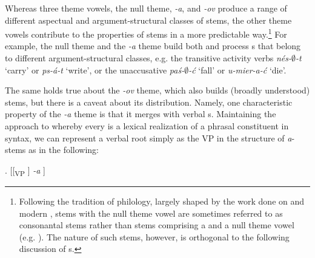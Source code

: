 \par
Whereas three  theme vowels, the null theme, \textit{-a}, and \textit{-ov} produce a range of different aspectual and argument-structural  classes of  stems, the other theme vowels contribute to the properties of  stems  in a more predictable way.\footnote{Following the tradition of  philology, largely shaped by the work done on  and modern ,   stems with the null theme vowel are sometimes referred to as consonantal stems rather than stems comprising a  and a null theme vowel (e.g. \citealt{Rubach1984,czayk1988,Jablonska2007}). The nature of such stems, however, is orthogonal to the following discussion of  s.  
} %
 For example, the null theme and the \textit{-a} theme build both  and process s that belong to different argument-structural classes, e.g. the  transitive activity verbs \textit{n\'es-$\emptyset$-t} `carry' or \textit{ps-\'a-t} `write', or the  unaccusative \textit{pa\'s-$\emptyset$-\'c} `fall' or \textit{u-mier-a-\'c} `die'. 
\par
The same holds true about the \textit{-ov} theme, which also builds (broadly understood)  stems, but there is a caveat about its distribution.  Namely, one characteristic property of the \textit{-a} theme is that it merges with verbal s. Maintaining the approach to  whereby every  is a lexical realization of a phrasal constituent in syntax, we can represent a verbal root simply as the VP in the structure of \textit{a}-stems as in the following:   

\ex. 
[[\textsubscript{VP}  ] \textit{-a} ]

